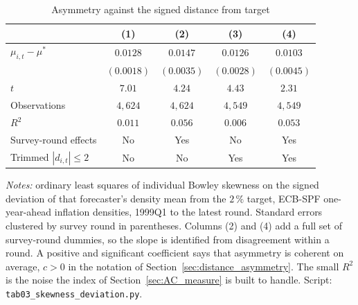 \begin{table}[tbp]\centering
\caption{Asymmetry against the signed distance from target}\label{tab:skew_dev_regs}
\begin{tabular}{lcccc}
\toprule
 & (1) & (2) & (3) & (4) \\
\midrule
$\mu_{i,t}-\mu^{*}$ & $0.0128$ & $0.0147$ & $0.0126$ & $0.0103$ \\
                    & $(0.0018)$ & $(0.0035)$ & $(0.0028)$ & $(0.0045)$ \\
$t$                 & $7.01$ & $4.24$ & $4.43$ & $2.31$ \\
\midrule
Observations        & $4{,}624$ & $4{,}624$ & $4{,}549$ & $4{,}549$ \\
$R^2$               & $0.011$ & $0.056$ & $0.006$ & $0.053$ \\
Survey-round effects & No & Yes & No & Yes \\
Trimmed $|d_{i,t}|\leq 2$ & No & No & Yes & Yes \\
\bottomrule
\end{tabular}
\vspace{0.3em}
\parbox{0.95\linewidth}{\footnotesize \textit{Notes:} ordinary least squares of individual
Bowley skewness on the signed deviation of that forecaster's density mean from the $2\,\%$
target, ECB-SPF one-year-ahead inflation densities, 1999Q1 to the latest round. Standard
errors clustered by survey round in parentheses. Columns (2) and (4) add a full set of
survey-round dummies, so the slope is identified from disagreement within a round. A positive
and significant coefficient says that asymmetry is coherent on average, $c>0$ in the notation
of Section~\ref{sec:distance_asymmetry}. The small $R^2$ is the noise the index of
Section~\ref{sec:AC_measure} is built to handle. Script: \texttt{tab03\_skewness\_deviation.py}.}
\end{table}
